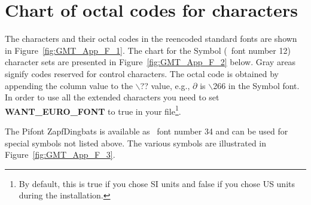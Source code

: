 %
%
\chapter{Chart of octal codes for characters}
\thispagestyle{headings}


The characters and their octal codes in the reencoded standard fonts
are shown in Figure~\ref{fig:GMT_App_F_1}.  The chart for
the Symbol (\GMT\ font number 12) character
sets are presented in Figure~\ref{fig:GMT_App_F_2} below.  Gray
areas signify codes reserved for
control characters.  The octal code is obtained by appending the
column value to the $\backslash$?? value, e.g., $\partial$ is
$\backslash$266 in the Symbol font.  In order to use all the extended
characters you need to set {\bf WANT\_EURO\_FONT} to true in your
 file\footnote{By default, this is true if you chose
SI units and false if you chose US units during the installation.}.


The Pifont ZapfDingbats is available as \GMT\ font number 34 and
can be used for special symbols not listed above.  The various
symbols are illustrated in Figure~\ref{fig:GMT_App_F_3}.

